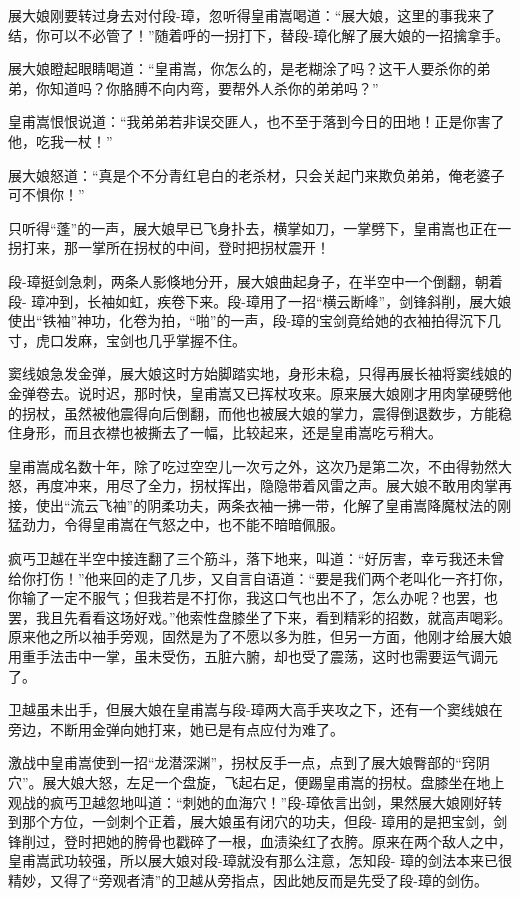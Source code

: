 \documentclass[12pt,oneside]{book}
\begin{document}
展大娘刚要转过身去对付段-璋，忽听得皇甫嵩喝道：``展大娘，这里的事我来了结，你可以不必管了！''随着呼的一拐打下，替段-璋化解了展大娘的一招擒拿手。

展大娘瞪起眼睛喝道：``皇甫嵩，你怎么的，是老糊涂了吗？这干人要杀你的弟弟，你知道吗？你胳膊不向内弯，要帮外人杀你的弟弟吗？''

皇甫嵩恨恨说道：``我弟弟若非误交匪人，也不至于落到今日的田地！正是你害了他，吃我一杖！''

展大娘怒道：``真是个不分青红皂白的老杀材，只会关起门来欺负弟弟，俺老婆子可不惧你！''

只听得``蓬''的一声，展大娘早已飞身扑去，横掌如刀，一掌劈下，皇甫嵩也正在一拐打来，那一掌所在拐杖的中间，登时把拐杖震开！

段-璋挺剑急刺，两条人影倏地分开，展大娘曲起身子，在半空中一个倒翻，朝着段-
璋冲到，长袖如虹，疾卷下来。段-璋用了一招``横云断峰''，剑锋斜削，展大娘使出``铁袖''神功，化卷为拍，``啪''的一声，段-璋的宝剑竟给她的衣袖拍得沉下几寸，虎口发麻，宝剑也几乎掌握不住。

窦线娘急发金弹，展大娘这时方始脚踏实地，身形未稳，只得再展长袖将窦线娘的金弹卷去。说时迟，那时快，皇甫嵩又已挥杖攻来。原来展大娘刚才用肉掌硬劈他的拐杖，虽然被他震得向后倒翻，而他也被展大娘的掌力，震得倒退数步，方能稳住身形，而且衣襟也被撕去了一幅，比较起来，还是皇甫嵩吃亏稍大。

皇甫嵩成名数十年，除了吃过空空儿一次亏之外，这次乃是第二次，不由得勃然大怒，再度冲来，用尽了全力，拐杖挥出，隐隐带着风雷之声。展大娘不敢用肉掌再接，使出``流云飞袖''的阴柔功夫，两条衣袖一拂一带，化解了皇甫嵩降魔杖法的刚猛劲力，令得皇甫嵩在气怒之中，也不能不暗暗佩服。

疯丐卫越在半空中接连翻了三个筋斗，落下地来，叫道：``好厉害，幸亏我还未曾给你打伤！''他来回的走了几步，又自言自语道：``要是我们两个老叫化一齐打你，你输了一定不服气；但我若是不打你，我这口气也出不了，怎么办呢？也罢，也罢，我且先看看这场好戏。''他索性盘膝坐了下来，看到精彩的招数，就高声喝彩。原来他之所以袖手旁观，固然是为了不愿以多为胜，但另一方面，他刚才给展大娘用重手法击中一掌，虽未受伤，五脏六腑，却也受了震荡，这时也需要运气调元了。

卫越虽未出手，但展大娘在皇甫嵩与段-璋两大高手夹攻之下，还有一个窦线娘在旁边，不断用金弹向她打来，她已是有点应付为难了。

激战中皇甫嵩使到一招``龙潜深渊''，拐杖反手一点，点到了展大娘臀部的``窍阴穴''。展大娘大怒，左足一个盘旋，飞起右足，便踢皇甫嵩的拐杖。盘膝坐在地上观战的疯丐卫越忽地叫道：``刺她的血海穴！''段-璋依言出剑，果然展大娘刚好转到那个方位，一剑刺个正着，展大娘虽有闭穴的功夫，但段-
璋用的是把宝剑，剑锋削过，登时把她的胯骨也戳碎了一根，血渍染红了衣胯。原来在两个敌人之中，皇甫嵩武功较强，所以展大娘对段-璋就没有那么注意，怎知段-
璋的剑法本来已很精妙，又得了``旁观者清''的卫越从旁指点，因此她反而是先受了段-璋的剑伤。
\end{document}
